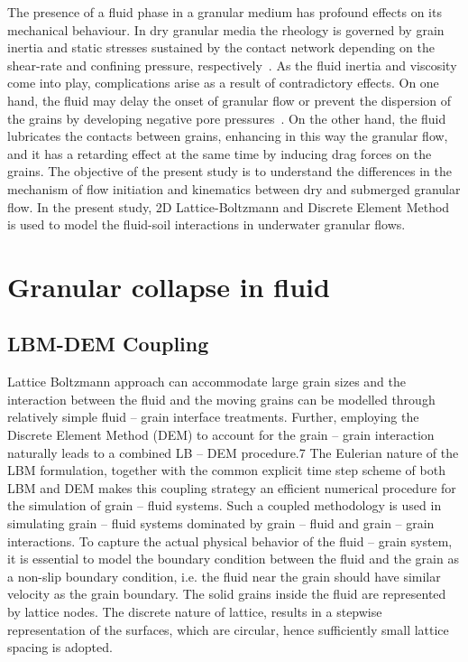 The presence of a fluid phase in a granular medium has profound effects on its 
mechanical behaviour. In dry granular media the rheology is governed by grain 
inertia and static stresses sustained by the contact network depending on the 
shear-rate and confining pressure, respectively~\citep{Midi2004}. As the fluid 
inertia and viscosity come into play, complications arise as a result of 
contradictory effects. On one hand, the fluid may delay the onset of
granular flow or prevent the dispersion of the grains by
developing negative pore pressures~\citep{Pailha2008,Topin2011}. On the other
hand, the fluid lubricates the contacts between grains, enhancing in this way 
the granular flow, and it has a retarding effect at the same time by inducing 
drag forces on the grains. The objective of the present study is to understand 
the differences in the mechanism of flow initiation and kinematics between dry 
and submerged granular flow. In the present study, 2D Lattice-Boltzmann and 
Discrete Element Method is used to model the fluid-soil interactions in  
underwater granular flows.

\section{Granular collapse in fluid}

\subsection{LBM-DEM Coupling}

Lattice Boltzmann approach can accommodate large grain sizes and the 
interaction between the fluid and the moving grains can be modelled through 
relatively simple fluid – grain interface treatments. Further, employing the 
Discrete Element Method (DEM) to account for the grain – grain interaction 
naturally leads to a combined LB – DEM procedure.7 The Eulerian nature of the 
LBM formulation, together with the common explicit time step scheme of both LBM 
and DEM makes this coupling strategy an efficient numerical procedure for the 
simulation of grain – fluid systems. Such a coupled methodology is used in 
simulating grain – fluid systems dominated by grain – fluid and grain – grain 
interactions. To capture the actual physical behavior of the fluid – grain 
system, it is essential to model the boundary condition between the fluid and 
the grain as a non-slip boundary condition, i.e. the fluid near the grain 
should have similar velocity as the grain boundary. The solid grains inside the 
fluid are represented by lattice nodes. The discrete nature of lattice, results 
in a stepwise representation of the surfaces, which are circular, hence 
sufficiently small lattice spacing is adopted. 

